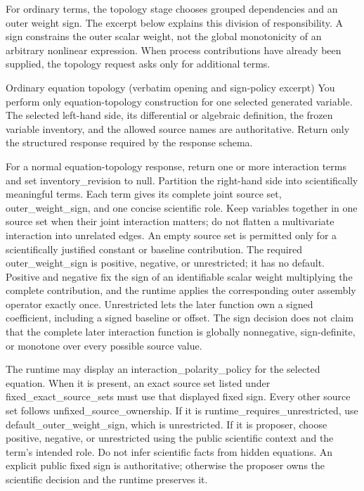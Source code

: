 For ordinary terms, the topology stage chooses grouped dependencies and an outer
weight sign. The excerpt below explains this division of responsibility. A sign
constrains the outer scalar weight, not the global monotonicity of an arbitrary
nonlinear expression. When process contributions have already been supplied,
the topology request asks only for additional terms.

\begin{afpromptbox}{Ordinary equation topology (verbatim opening and sign-policy excerpt)}
You perform only equation-topology construction for one selected generated
variable. The selected left-hand side, its differential or algebraic
definition, the frozen variable inventory, and the allowed source names are
authoritative. Return only the structured response required by the response
schema.

For a normal equation-topology response, return one or more interaction
terms and set inventory_revision to null. Partition the right-hand side into
scientifically meaningful terms. Each term gives its complete joint source
set, outer_weight_sign, and one concise scientific role. Keep variables
together in one source set when their joint interaction matters; do not
flatten a multivariate interaction into unrelated edges. An empty source set
is permitted only for a scientifically justified constant or baseline
contribution. The required outer_weight_sign is positive, negative, or
unrestricted; it has no default. Positive and negative fix the sign of an
identifiable scalar weight multiplying the complete contribution, and the
runtime applies the corresponding outer assembly operator exactly once.
Unrestricted lets the later function own a signed coefficient, including a
signed baseline or offset. The sign decision does not claim that the
complete later interaction function is globally nonnegative, sign-definite,
or monotone over every possible source value.

The runtime may display an interaction_polarity_policy for the selected
equation. When it is present, an exact source set listed under
fixed_exact_source_sets must use that displayed fixed sign. Every other
source set follows unfixed_source_ownership. If it is
runtime_requires_unrestricted, use default_outer_weight_sign, which is
unrestricted. If it is proposer, choose positive, negative, or unrestricted
using the public scientific context and the term's intended role. Do not
infer scientific facts from hidden equations. An explicit public fixed sign
is authoritative; otherwise the proposer owns the scientific decision and
the runtime preserves it.
\end{afpromptbox}

